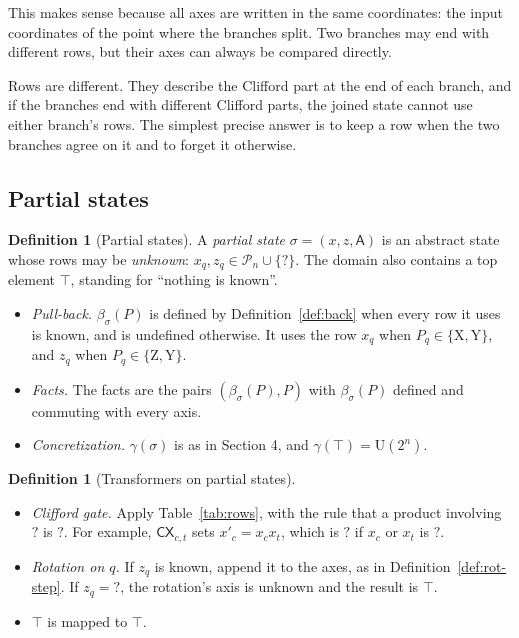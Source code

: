 \documentclass[11pt]{article}
\theoremstyle{definition}
\newtheorem{definition}[theorem]{Definition}
\theoremstyle{remark}
\newcommand{\Pauli}{\mathcal{P}_n}
\newcommand{\Unit}{\mathrm{U}(2^n)}
\newcommand{\gam}{\gamma}
\newcommand{\Ax}{\mathsf{A}}
\newcommand{\back}{\beta}
\newcommand{\tX}{\mathrm{X}}
\newcommand{\tY}{\mathrm{Y}}
\newcommand{\tZ}{\mathrm{Z}}
\newcommand{\gate}[1]{\mathsf{#1}}
\begin{document}
This makes sense because all axes are written in the same coordinates: the input
coordinates of the point where the branches split. Two branches may end with different
rows, but their axes can always be compared directly.

Rows are different. They describe the Clifford part at the end of each branch, and if the
branches end with different Clifford parts, the joined state cannot use either branch's
rows. The simplest precise answer is to keep a row when the two branches agree on it and
to forget it otherwise.

\subsection{Partial states}

\begin{definition}[Partial states]
A \emph{partial state} $\sigma = (x, z, \Ax)$ is an abstract state whose rows may be
\emph{unknown}: $x_q, z_q \in \Pauli \cup \{?\}$. The domain also contains a top element
$\top$, standing for ``nothing is known''.
\begin{itemize}[nosep]
  \item \emph{Pull-back.} $\back_\sigma(P)$ is defined by Definition~\ref{def:back} when
  every row it uses is known, and is undefined otherwise. It uses the row $x_q$ when
  $P_q \in \{\tX, \tY\}$, and $z_q$ when $P_q \in \{\tZ, \tY\}$.
  \item \emph{Facts.} The facts are the pairs $(\back_\sigma(P), P)$ with
  $\back_\sigma(P)$ defined and commuting with every axis.
  \item \emph{Concretization.} $\gam(\sigma)$ is as in Section 4, and $\gam(\top) = \Unit$.
\end{itemize}
\end{definition}

\begin{definition}[Transformers on partial states]
\leavevmode
\begin{itemize}[nosep]
  \item \emph{Clifford gate.} Apply Table~\ref{tab:rows}, with the rule that a product
  involving $?$ is $?$. For example, $\gate{CX}_{c,t}$ sets $x'_c = x_c x_t$, which is $?$
  if $x_c$ or $x_t$ is $?$.
  \item \emph{Rotation on $q$.} If $z_q$ is known, append it to the axes, as in
  Definition~\ref{def:rot-step}. If $z_q = ?$, the rotation's axis is unknown and the result
  is $\top$.
  \item \emph{$\top$} is mapped to $\top$.
\end{itemize}
\end{definition}
\end{document}
